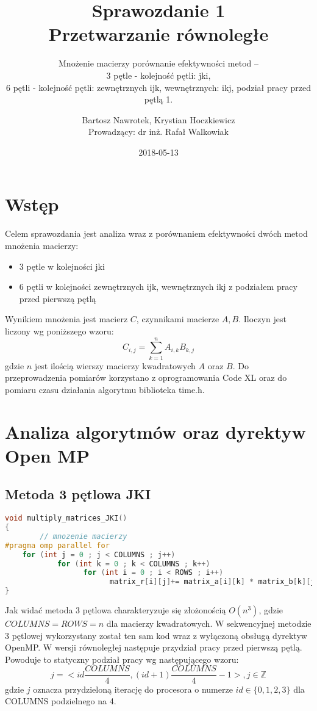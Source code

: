 \documentclass{scrartcl}
\title{Sprawozdanie 1 \\ Przetwarzanie równoległe}
\subtitle{Mnożenie macierzy porównanie efektywności metod –\\
3 pętle - kolejność pętli: jki,\\
6 pętli - kolejność pętli: zewnętrznych ijk, wewnętrznych: ikj, podział pracy przed pętlą 1.}
\date{2018-05-13}
\author{Bartosz Nawrotek, Krystian Hoczkiewicz \\
Prowadzący: dr inż. Rafał Walkowiak}
\begin{document}
\maketitle
\section{Wstęp}
Celem sprawozdania jest analiza wraz z porównaniem efektywności dwóch metod mnożenia macierzy:
\begin{itemize}
\item {3 pętle w kolejności jki}
\item {6 pętli w kolejności zewnętrznych ijk, wewnętrznych ikj z podziałem pracy przed pierwszą pętlą}
\end{itemize}
Wynikiem mnożenia jest macierz $C$, czynnikami macierze $A, B$. Iloczyn jest liczony wg poniższego wzoru:
\begin{equation}
C_{i, j} = \sum_{k = 1}^{n}{A_{i, k}B_{k, j}}
\end{equation}
gdzie $n$ jest ilością wierszy macierzy kwadratowych $A$ oraz $B$.
Do przeprowadzenia pomiarów korzystano z oprogramowania Code XL oraz do pomiaru czasu działania algorytmu biblioteka time.h.
\section{Analiza algorytmów oraz dyrektyw Open MP}
\subsection{Metoda 3 pętlowa JKI}
\begin{lstlisting}[language=C++, caption={Metoda trzypętlowa}]
void multiply_matrices_JKI()
{
        // mnozenie macierzy 
#pragma omp parallel for 
	for (int j = 0 ; j < COLUMNS ; j++)
      	    for (int k = 0 ; k < COLUMNS ; k++) 
                  for (int i = 0 ; i < ROWS ; i++) 
                        matrix_r[i][j]+= matrix_a[i][k] * matrix_b[k][j] ;              
}
\end{lstlisting}
Jak widać metoda 3 pętlowa charakteryzuje się złożonością $O(n^3)$, gdzie $COLUMNS = ROWS = n$ dla macierzy kwadratowych. W sekwencyjnej metodzie 3 pętlowej wykorzystany został ten sam kod wraz z wyłączoną obsługą dyrektyw OpenMP. W wersji równoległej następuje przydział pracy przed pierwszą pętlą. Powoduje to statyczny podział pracy wg następującego wzoru:
\begin{equation}
j = <id \frac{COLUMNS}{4}, (id + 1)\frac{COLUMNS}{4} - 1>,
j \in \mathbb{Z}
\end{equation}
gdzie $j$ oznacza przydzieloną iterację do procesora o numerze $id \in \{0, 1, 2, 3\}$ dla COLUMNS podzielnego na 4.
\end{document}
